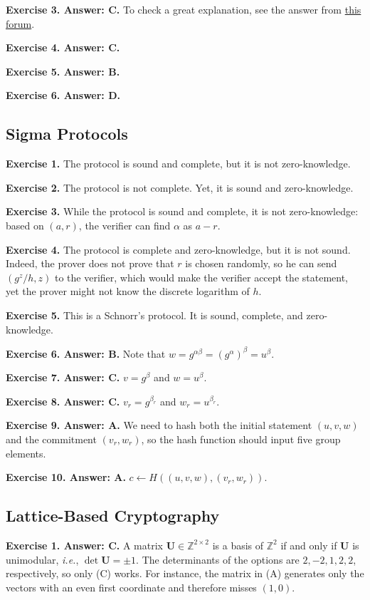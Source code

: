 \documentclass[../../book]{subfiles}
\begin{document}
\textbf{Exercise 3. Answer: C.} To check a great explanation, see the answer
from
\href{https://crypto.stackexchange.com/questions/9528/zero-knowledge-proof-using-quadratic-residue-why-two-options}{this
forum}.

\textbf{Exercise 4. Answer: C.}

\textbf{Exercise 5. Answer: B.}

\textbf{Exercise 6. Answer: D.}

\subsection*{Sigma Protocols}

\textbf{Exercise 1.} The protocol is sound and complete, but it is not zero-knowledge.

\textbf{Exercise 2.} The protocol is not complete. Yet, it is sound and zero-knowledge.

\textbf{Exercise 3.} While the protocol is sound and complete, it is not zero-knowledge: 
based on $(a,r)$, the verifier can find $\alpha$ as $a-r$.

\textbf{Exercise 4.} The protocol is complete and zero-knowledge, but it is not
sound. Indeed, the prover does not prove that $r$ is chosen randomly, so he can
send $(g^z/h, z)$ to the verifier, which would make the verifier accept the
statement, yet the prover might not know the discrete logarithm of $h$.

\textbf{Exercise 5.} This is a Schnorr's protocol. It is sound, complete, and
zero-knowledge.

\textbf{Exercise 6. Answer: B.} Note that
$w=g^{\alpha\beta}=(g^{\alpha})^{\beta}=u^{\beta}$. 

\textbf{Exercise 7. Answer: C.} $v=g^{\beta}$ and $w=u^{\beta}$.

\textbf{Exercise 8. Answer: C.} $v_r=g^{\beta_r}$ and $w_r=u^{\beta_r}$.

\textbf{Exercise 9. Answer: A.} We need to hash both the initial statement
$(u,v,w)$ and the commitment $(v_r,w_r)$, so the hash function should input five 
group elements.

\textbf{Exercise 10. Answer: A.} $c \gets H((u,v,w),(v_r,w_r))$.

\subsection*{Lattice-Based Cryptography}
 
\textbf{Exercise 1. Answer: C.} A matrix $\mathbf{U} \in \mathbb{Z}^{2 \times 2}$ is a basis of $\mathbb{Z}^2$ if and only if $\mathbf{U}$ is unimodular, \textit{i.e.}, $\det \mathbf{U} = \pm 1$.
The determinants of the options are $2, -2, 1, 2, 2$, respectively, so only (C) works.
For instance, the matrix in (A) generates only the vectors with an even first coordinate and therefore misses $(1,0)$.
 
\end{document}
